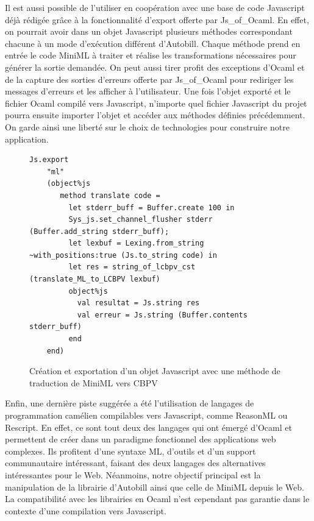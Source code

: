 \documentclass[12pt]{article}
\begin{document}
Il est aussi possible de l'utiliser en coopération avec une base de code Javascript déjà rédigée grâce à la fonctionnalité d'export offerte par Js\_of\_Ocaml. En effet, on pourrait avoir dans un objet Javascript plusieurs méthodes correspondant chacune à un mode d'exécution différent d'Autobill. Chaque méthode prend en entrée le code MiniML à traiter et réalise les transformations nécessaires pour générer la sortie demandée. On peut aussi tirer profit des exceptions d'Ocaml et de la capture des sorties d'erreurs offerte par Js\_of\_Ocaml pour rediriger les messages d'erreurs et les afficher à l'utilisateur. Une fois l'objet exporté et le fichier Ocaml compilé vers Javascript, n'importe quel fichier Javascript du projet pourra ensuite importer l'objet et accéder aux méthodes définies précédemment. On garde ainsi une liberté sur le choix de technologies pour construire notre application.\\

\begin{figure}[!b]
\begin{lstlisting}[language=caml]
Js.export
    "ml"
    (object%js
       method translate code =
         let stderr_buff = Buffer.create 100 in
         Sys_js.set_channel_flusher stderr (Buffer.add_string stderr_buff);
         let lexbuf = Lexing.from_string ~with_positions:true (Js.to_string code) in
         let res = string_of_lcbpv_cst (translate_ML_to_LCBPV lexbuf)
         object%js
           val resultat = Js.string res
           val erreur = Js.string (Buffer.contents stderr_buff)
         end
    end)
\end{lstlisting}
\caption{Création et exportation d'un objet Javascript avec une méthode de traduction de MiniML vers CBPV}
\end{figure}
Enfin, une dernière piste suggérée a été l'utilisation de langages de programmation camélien compilables vers Javascript, comme ReasonML ou Rescript. En effet, ce sont tout deux des langages qui ont émergé d'Ocaml et permettent de créer dans un paradigme fonctionnel des applications web complexes. Ils profitent d'une syntaxe ML, d'outils et d'un support communautaire intéressant, faisant des deux langages des alternatives intéressantes pour le Web. Néanmoins, notre objectif principal est la manipulation de la librairie d'Autobill ainsi que celle de MiniML depuis le Web. La compatibilité avec les librairies en Ocaml n'est cependant pas garantie dans le contexte d'une compilation vers Javascript. \\
\end{document}
